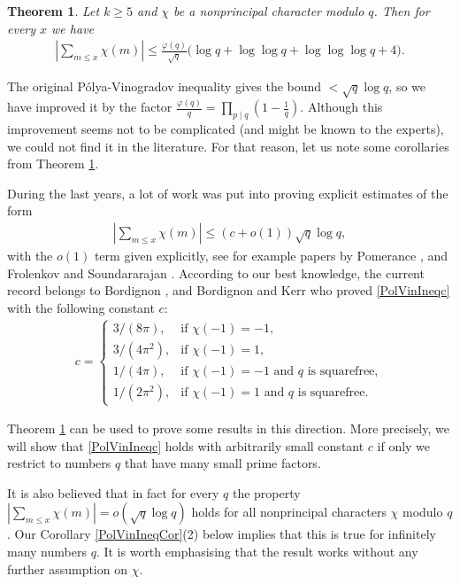\documentclass[a4paper]{amsart}
\newtheorem{theorem}{Theorem}[section]
\newcommand{\1}{\mathbbm{1}}
\begin{document}
\begin{theorem}\label{ThmPolVino}
Let $k\geq 5$ and $\chi$ be a nonprincipal character modulo $q$. Then for every $x$ we have
\begin{align*}
\left|\sum_{m\leq x}\chi (m)\right|\leq \frac{\varphi(q)}{\sqrt{q}}\big(\log q + \log\log q + \log\log\log q + 4\big) .
\end{align*}
\end{theorem}

The original Pólya-Vinogradov inequality gives the bound $<\sqrt{q}\log q$, so we have improved it by the factor $\frac{\varphi(q)}{q}=\prod_{p\mid q}\left(1-\frac{1}{q}\right)$. Although this improvement seems not to be complicated (and might be known to the experts), we could not find it in the literature. For that reason, let us note some corollaries from Theorem \ref{ThmPolVino}.

During the last years, a lot of work was put into proving explicit estimates of the form
\begin{align}\label{PolVinIneqc}
\left|\sum_{m\leq x}\chi (m)\right|\leq (c+o(1))\sqrt{q}\log q,
\end{align}
with the $o(1)$ term given explicitly, see for example papers by Pomerance \cite{Pom}, and Frolenkov and Soundararajan \cite{FS}. According to our best knowledge, the current record belongs to Bordignon \cite{B}, and Bordignon and Kerr \cite{BK} who proved \eqref{PolVinIneqc} with the following constant $c$:
\begin{align}\label{Equc}
c = \left\{\begin{array}{ll}
3/(8\pi), & \textrm{if } \chi (-1)=-1, \\
3/(4\pi^{2}), & \textrm{if } \chi (-1)=1, \\
1/(4\pi), & \textrm{if } \chi (-1)=-1\textrm{ and } q \textrm{ is squarefree}, \\
1/(2\pi^{2}), & \textrm{if } \chi (-1)=1\textrm{ and } q \textrm{ is squarefree}.
\end{array}\right.
\end{align}

Theorem \ref{ThmPolVino} can be used to prove some results in this direction. More precisely, we will show that \eqref{PolVinIneqc} holds with arbitrarily small constant $c$ if only we restrict to numbers $q$ that have many small prime factors.

It is also believed that in fact for every $q$ the property $\left|\sum_{m\leq x}\chi (m)\right|=o(\sqrt{q}\log q)$ holds for all nonprincipal characters $\chi$ modulo $q$. Our Corollary \ref{PolVinIneqCor}(2) below implies that this is true for infinitely many numbers $q$. It is worth emphasising that the result works without any further assumption on $\chi$. 
\end{document}
